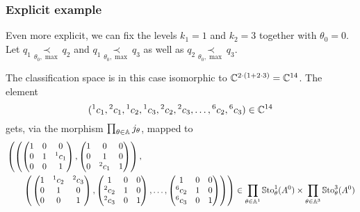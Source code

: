 \subsubsection{Explicit example}
\def\kOne{1}
\def\kTwo{3}
\def\zkOnepzKtwo{14} %
\def\zkOne{2} %
\def\zkTwo{6} %

Even more explicit, we can fix the levels $k_1=\kOne$ and $k_2=\kTwo$ together
with $\theta_0=0$.
Let $q_1 \underset{\theta_0,\max}{\prec} q_2$ and $q_1
\underset{\theta_0,\max}{\prec} q_3$ as well as $q_2
\underset{\theta_0,\max}{\prec} q_3$.

The classification space is in this case isomorphic to
$\C^{2\cdot(\kOne+2\cdot\kTwo)}=\C^{\zkOnepzKtwo}$.
The element
\[
  ({}^1c_1,{}^2c_1,
  {}^1c_2,{}^1c_3,{}^2c_2,{}^2c_3,\dots,{}^{\zkTwo}c_2,{}^{\zkTwo}c_3)
  \in\C^{\zkOnepzKtwo}
\]
gets, via the morphism $\prod_{\theta\in\mathbb{A}}j_\theta$, mapped to
\begin{align*}
  &\left(
  \left(
    \begin{pmatrix} 1 & 0 & 0 \\0 & 1 & {}^1c_1 \\0 & 0 & 1 \end{pmatrix},
    \begin{pmatrix} 1 & 0 & 0 \\0 & 1 & 0 \\0 & {}^2c_1 & 1 \end{pmatrix}
  \right),
  \right.
\\&\qquad\left(
  \left.
    \begin{pmatrix} 1 & {}^1c_2 & {}^2c_3 \\0 & 1 & 0 \\0 & 0 & 1 \end{pmatrix},
    \begin{pmatrix} 1 & 0 & 0 \\{}^2c_2 & 1 & 0 \\{}^2c_3 & 0 & 1 \end{pmatrix},
    \dots,
    \begin{pmatrix} 1 & 0 & 0 \\{}^{\zkTwo}c_2 & 1 & 0 \\{}^{\zkTwo}c_3 & 0 & 1 \end{pmatrix}
  \right)
  \right)
  \in
  \prod_{\theta\in\A^{\kOne}}\SSto_{\theta}^{\kOne}(A^0)
  \times
  \prod_{\theta\in\A^{\kTwo}}\SSto_{\theta}^{\kTwo}(A^0)
\end{align*}
